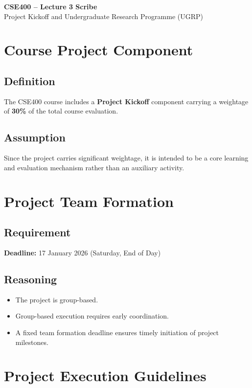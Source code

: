 \documentclass[12pt]{article}
\begin{document}
\begin{center}
    {\Large \textbf{CSE400 -- Lecture 3 Scribe}}\\[0.3cm]
    {\large Project Kickoff and Undergraduate Research Programme (UGRP)}
\end{center}

\vspace{0.5cm}

\section{Course Project Component}

\subsection{Definition}
The CSE400 course includes a \textbf{Project Kickoff} component carrying a weightage of \textbf{30\%} of the total course evaluation.

\subsection{Assumption}
Since the project carries significant weightage, it is intended to be a core learning and evaluation mechanism rather than an auxiliary activity.

\section{Project Team Formation}

\subsection{Requirement}
\textbf{Deadline:} 17 January 2026 (Saturday, End of Day)

\subsection{Reasoning}
\begin{itemize}
    \item The project is group-based.
    \item Group-based execution requires early coordination.
    \item A fixed team formation deadline ensures timely initiation of project milestones.
\end{itemize}

\section{Project Execution Guidelines}
\end{document}
